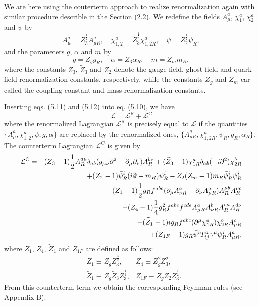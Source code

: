 We are here using the couterterm approach to realize renormalization again with similar procedure describle in the Section (2.2). We redefine the fields $A_\mu^a$, $\chi^a_1$, $\chi_2^a$ and $\psi$ by
\begin{equation}
A_\mu^a=Z_3^\frac{1}{2} A_{\mu R}^a,\quad \chi^a_{1,2}=\widetilde{Z}^\frac{1}{2}_3\chi^a_{1,2R} ,\quad\psi=Z^\frac{1}{2}_2\psi_R,
\end{equation}
and the parameters $g$, $\alpha$ and $m$ by
\begin{equation}
g=Z_g g_R,\quad\alpha=Z_3\alpha_R,\quad m=Z_m m_R,
\end{equation}
where the constants $Z_3$, $\widetilde{Z}_3$ and $Z_2$ denote the gauge field, ghost field and quark field renormalization constants, respectively, while the constants $Z_g$ and $Z_m$ car called the coupling-constant and mass renormalization constants. 

Inserting eqs. (5.11) and (5.12) into eq. (5.10), we have 
\begin{equation}
\mathcal{L}=\mathcal{L}^\text{R}+\mathcal{L}^\text{C}
\end{equation}
where the renormalized Lagrangian $\mathcal{L}^\text{R}$ is precisely equal to $\mathcal{L}$ if the quantities $\{A^a_\mu,\chi^a_{1,2},\psi,g,\alpha\}$ are replaced by the renormalized ones, $\{A^a_{\mu R},\chi^a_{1,2R},\psi_R,g_R,\alpha_R\}$. The counterterm Lagrangian $\mathcal{L}^\text{C}$ is given by 
\begin{eqnarray}
\mathcal{L}^\text{C}&=&(Z_3-1)\frac{1}{2}A_R^{a\mu}\delta_{ab}(g_{\mu\nu}\partial^2-\partial_\mu\partial_\nu)A_R^{b\nu}+(\widetilde{Z}_3-1)\chi_{1R}^a\delta_{ab}(-i\partial^2)\chi_{2R}^b\nonumber\\
&&+(Z_2-1)\bar{\psi}^i_R(i\slashed\partial-m_R)\psi_R^i-Z_2(Z_m-1)m_R\bar{\psi}^i_R\psi^i_R\nonumber\\
&&-(Z_1-1)\frac{1}{2}g_Rf^{abc}(\partial_\mu A^a_{\nu R}-\partial_\nu A^a_{\mu R})A_R^{\mu b}A_R^{\nu c}\nonumber\\
&&-(Z_4-1)\frac{1}{4}g^2_Rf^{abe}f^{cde}A^a_{\mu R}A^b_{\nu R}A_R^{c\mu}A_R^{d\nu}\nonumber\\
&&-(\widetilde{Z}_1-1)ig_Rf^{abc}(\partial^\mu\chi_{1R}^a)\chi_{2R}^bA^c_{\mu R}\nonumber\\
&&+(Z_{1F}-1)g_R\bar{\psi}^iT^a_{ij}\gamma^\mu\psi_R^jA^a_{\mu R},
\end{eqnarray}
where $Z_1$, $Z_4$, $\widetilde{Z}_1$ and $Z_{1F}$ are defined as follows:
\begin{eqnarray}
&Z_1\equiv Z_gZ_3^\frac{3}{2}, & Z_4\equiv Z^2_gZ^2_3,\nonumber\\
&\widetilde{Z}_1\equiv Z_g\widetilde{Z}_3Z_3^\frac{1}{2}, & Z_{1F}\equiv Z_gZ_2Z_3^\frac{1}{2}.
\end{eqnarray}
From this counterterm term we obtain the corresponding Feynman rules (see Appendix B).

